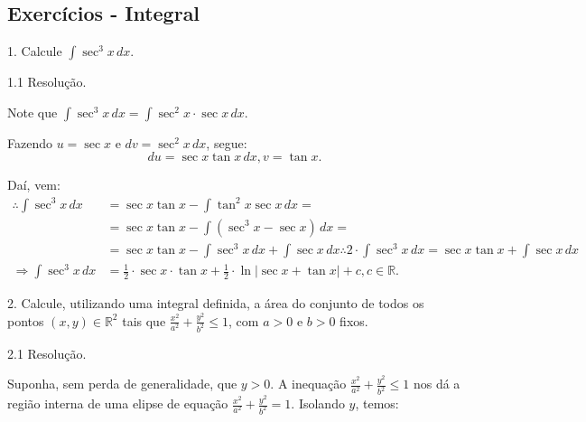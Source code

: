 \documentclass{article}
\begin{document}
{\begin{newpage}
\subsection{Exercícios - Integral}
\par
\begin{flushleft}
1. Calcule $\displaystyle{\int \sec^{3}{x}\, dx}$.
\end{flushleft}
\par
\vspace{0.3cm}
\begin{flushleft}
1.1 Resolução.
\end{flushleft}
\par Note que $\displaystyle{\int \sec^{3}{x}\, dx = \int \sec^{2}{x}\cdot\sec{x}\, dx}$.
\par Fazendo $u = \sec{x}$ e $dv = \sec^{2}{x}\, dx$, segue:
\begin{equation*}\displaystyle{du = \sec{x}\tan{x}\, dx , v = \tan{x} .}\end{equation*}
\par Daí, vem:
\begin{equation*}\displaystyle{\begin{split}
\therefore\int\sec^{3}{x}\, dx &=\sec{x}\tan{x}-\int\tan^{2}{x}\sec{x}\, dx= \\ &=\sec{x}\tan{x}-\int (\sec^{3}{x}-\sec{x})\, dx= \\
&=\sec{x}\tan{x}-\int\sec^{3}{x}\, dx+\int\sec{x}\, dx
\therefore 2\cdot\int\sec^{3}{x}\, dx=\sec{x}\tan{x}+\int\sec{x}\, dx \\ \Rightarrow\int\sec^{3}{x}\, dx &=\frac{1}{2}\cdot\sec{x}\cdot\tan{x}+ \frac{1}{2}\cdot\ln{|\sec{x}+\tan{x}|}+c, c\in\mathbb{R}.
\end{split}}\end{equation*}
\par
\vspace{0.3cm}
\begin{flushleft}
2. Calcule, utilizando uma integral definida, a área do conjunto de todos os pontos $(x,y)\in\mathbb{R}^2$ tais que $\displaystyle{\frac{x^{2}}{a^{2}} + \frac{y^{2}}{b^{2}} \leq 1}$, com $a > 0$ e $b > 0$ fixos. 
\end{flushleft}
\par
\vspace{0.3cm}
\begin{flushleft}
2.1 Resolução.
\end{flushleft}
\par Suponha, sem perda de generalidade, que $y > 0$. A inequação $\displaystyle{\frac{x^{2}}{a^{2}} + \frac{y^{2}}{b^{2}} \leq 1}$ nos dá a região interna de uma elipse de equação $\displaystyle{\frac{x^2}{a^2} + \frac{y^2}{b^2} = 1}$. Isolando $y$, temos:

\end{newpage}}
\end{document}
